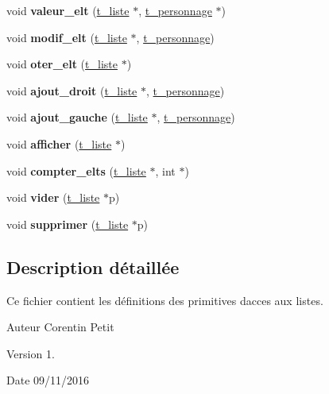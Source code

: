 \begin{DoxyCompactItemize}
\item 
void {\bfseries valeur\+\_\+elt} (\hyperlink{a00006}{t\+\_\+liste} $\ast$, \hyperlink{a00009}{t\+\_\+personnage} $\ast$)\hypertarget{a00025_aa016faa5e2ea12e04177251d111df07a}{}\label{a00025_aa016faa5e2ea12e04177251d111df07a}

\item 
void {\bfseries modif\+\_\+elt} (\hyperlink{a00006}{t\+\_\+liste} $\ast$, \hyperlink{a00009}{t\+\_\+personnage})\hypertarget{a00025_af48029077e382e3f7ff227c1ce8be5d9}{}\label{a00025_af48029077e382e3f7ff227c1ce8be5d9}

\item 
void {\bfseries oter\+\_\+elt} (\hyperlink{a00006}{t\+\_\+liste} $\ast$)\hypertarget{a00025_a89973d73d0150915530a583a62599968}{}\label{a00025_a89973d73d0150915530a583a62599968}

\item 
void {\bfseries ajout\+\_\+droit} (\hyperlink{a00006}{t\+\_\+liste} $\ast$, \hyperlink{a00009}{t\+\_\+personnage})\hypertarget{a00025_a8276e5c2a79bb28b7452184678a551fe}{}\label{a00025_a8276e5c2a79bb28b7452184678a551fe}

\item 
void {\bfseries ajout\+\_\+gauche} (\hyperlink{a00006}{t\+\_\+liste} $\ast$, \hyperlink{a00009}{t\+\_\+personnage})\hypertarget{a00025_a62451ec33d49a154efb6332bbc0ee413}{}\label{a00025_a62451ec33d49a154efb6332bbc0ee413}

\item 
void {\bfseries afficher} (\hyperlink{a00006}{t\+\_\+liste} $\ast$)\hypertarget{a00025_a1495faff01bebb63f22d610d32d1aab4}{}\label{a00025_a1495faff01bebb63f22d610d32d1aab4}

\item 
void {\bfseries compter\+\_\+elts} (\hyperlink{a00006}{t\+\_\+liste} $\ast$, int $\ast$)\hypertarget{a00025_a9679aebb698baa75a24ccd47b870a772}{}\label{a00025_a9679aebb698baa75a24ccd47b870a772}

\item 
void {\bfseries vider} (\hyperlink{a00006}{t\+\_\+liste} $\ast$p)\hypertarget{a00025_a7ecbb44530688750d47fa00a96d6add8}{}\label{a00025_a7ecbb44530688750d47fa00a96d6add8}

\item 
void {\bfseries supprimer} (\hyperlink{a00006}{t\+\_\+liste} $\ast$p)\hypertarget{a00025_aab08b37ee056b9411e2265637fb3af1c}{}\label{a00025_aab08b37ee056b9411e2265637fb3af1c}

\end{DoxyCompactItemize}


\subsection{Description détaillée}
Ce fichier contient les définitions des primitives d\textquotesingle{}acces aux listes. 

\begin{DoxyAuthor}{Auteur}
Corentin Petit 
\end{DoxyAuthor}
\begin{DoxyVersion}{Version}
1. 
\end{DoxyVersion}
\begin{DoxyDate}{Date}
09/11/2016 
\end{DoxyDate}
